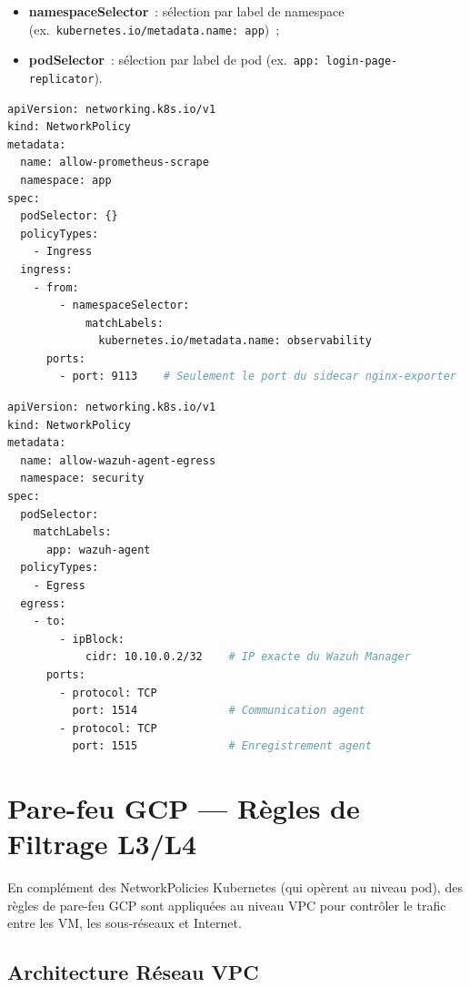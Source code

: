 \begin{itemize}
  \item \textbf{namespaceSelector}~: sélection par label de namespace
        (ex.~\texttt{kubernetes.io/metadata.name: app})~;
  \item \textbf{podSelector}~: sélection par label de pod
        (ex.~\texttt{app: login-page-replicator}).
\end{itemize}

\begin{lstlisting}[language=bash, caption=Exemple~: allow-prometheus-scrape (cross-namespace)]
apiVersion: networking.k8s.io/v1
kind: NetworkPolicy
metadata:
  name: allow-prometheus-scrape
  namespace: app
spec:
  podSelector: {}
  policyTypes:
    - Ingress
  ingress:
    - from:
        - namespaceSelector:
            matchLabels:
              kubernetes.io/metadata.name: observability
      ports:
        - port: 9113    # Seulement le port du sidecar nginx-exporter
\end{lstlisting}

\begin{lstlisting}[language=bash, caption=Exemple~: allow-wazuh-agent-egress (IP précise)]
apiVersion: networking.k8s.io/v1
kind: NetworkPolicy
metadata:
  name: allow-wazuh-agent-egress
  namespace: security
spec:
  podSelector:
    matchLabels:
      app: wazuh-agent
  policyTypes:
    - Egress
  egress:
    - to:
        - ipBlock:
            cidr: 10.10.0.2/32    # IP exacte du Wazuh Manager
      ports:
        - protocol: TCP
          port: 1514              # Communication agent
        - protocol: TCP
          port: 1515              # Enregistrement agent
\end{lstlisting}

\section{Pare-feu GCP --- Règles de Filtrage L3/L4}

En complément des NetworkPolicies Kubernetes (qui opèrent au niveau pod), des règles de
pare-feu GCP sont appliquées au niveau VPC pour contrôler le trafic entre les VM, les
sous-réseaux et Internet.

\subsection{Architecture Réseau VPC}

